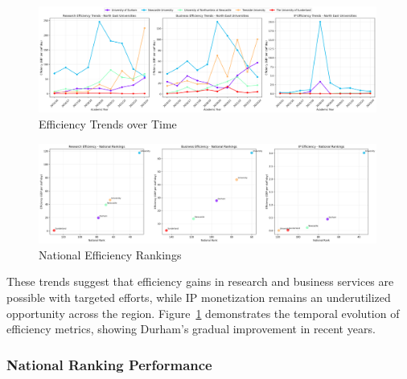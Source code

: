 \documentclass[journal,onecolumn, 10pt,draftclsnofoot]{IEEEtran}
\begin{document}
\begin{figure}[h]
\centering
\includegraphics[width=0.99\textwidth]{Fig/figure39.efficiency_trends.png}
\caption{Efficiency Trends over Time}
\label{fig:efficiency-trends}
\end{figure}

\begin{figure}[h]
\centering
\includegraphics[width=0.99\textwidth]{Fig/figure40.national_efficiency_rankings.png}
\caption{National Efficiency Rankings}
\label{fig:national-efficiency-rankings}
\end{figure}

These trends suggest that efficiency gains in research and business services are possible with targeted efforts, while IP monetization remains an underutilized opportunity across the region. Figure~\ref{fig:efficiency-trends} demonstrates the temporal evolution of efficiency metrics, showing Durham's gradual improvement in recent years.

\subsubsection{National Ranking Performance}
\end{document}
